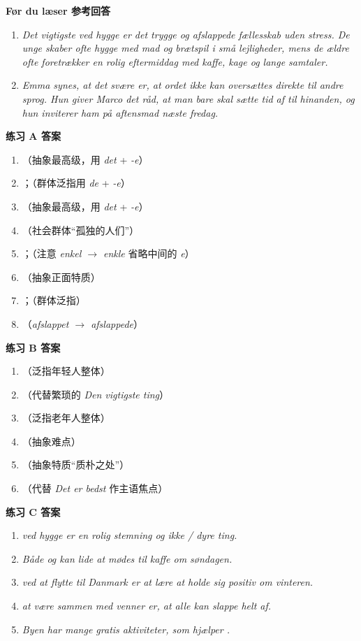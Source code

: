 \begin{answerbox}
\textbf{Før du læser 参考回答}
\begin{enumerate}
  \item \textit{Det vigtigste ved hygge er det trygge og afslappede fællesskab uden stress. De unge skaber ofte hygge med mad og brætspil i små lejligheder, mens de ældre ofte foretrækker en rolig eftermiddag med kaffe, kage og lange samtaler.}
  \item \textit{Emma synes, at det svære er, at ordet ikke kan oversættes direkte til andre sprog. Hun giver Marco det råd, at man bare skal sætte tid af til hinanden, og hun inviterer ham på aftensmad næste fredag.}
\end{enumerate}

\textbf{练习 A 答案}
\begin{enumerate}
  \item {}（抽象最高级，用 \textit{det} + \textit{-e}）
  \item {}；（群体泛指用 \textit{de} + \textit{-e}）
  \item {}（抽象最高级，用 \textit{det} + \textit{-e}）
  \item {}（社会群体“孤独的人们”）
  \item {}；（注意 \textit{enkel $\rightarrow$ enkle} 省略中间的 \textit{e}）
  \item {}（抽象正面特质）
  \item {}；（群体泛指）
  \item {}（\textit{afslappet $\rightarrow$ afslappede}）
\end{enumerate}

\textbf{练习 B 答案}
\begin{enumerate}
  \item {}（泛指年轻人整体）
  \item {}（代替繁琐的 \textit{Den vigtigste ting}）
  \item {}（泛指老年人整体）
  \item {}（抽象难点）
  \item {}（抽象特质“质朴之处”）
  \item {}（代替 \textit{Det er bedst} 作主语焦点）
\end{enumerate}

\textbf{练习 C 答案}
\begin{enumerate}
  \item \textit{ ved hygge er en rolig stemning og ikke  / dyre ting.}
  \item \textit{Både  og  kan lide at mødes til kaffe om søndagen.}
  \item \textit{ ved at flytte til Danmark er at lære at holde sig positiv om vinteren.}
  \item \textit{ at være sammen med venner er, at alle kan slappe helt af.}
  \item \textit{Byen har mange gratis aktiviteter, som hjælper .}
\end{enumerate}


\end{answerbox}
